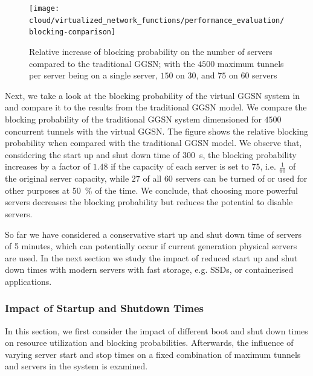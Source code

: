 \begin{figure}
  \centering
  \texttt{[image: cloud/virtualized\_network\_functions/performance\_evaluation/blocking-comparison]}
  \caption{Relative increase of blocking probability on the number of servers compared to the traditional \gls{GGSN}; with the \(4500\) maximum tunnels per server being on a single server, \(150\) on \(30\), and \(75\) on \(60\) servers}
  \label{fig:cloud:virtualized_network_functions:performance_evaluation:virtual_ggsn:blocking_comparison}
\end{figure}

Next, we take a look at the blocking probability of the virtual \gls{GGSN} system in  and compare it to the results from the traditional \gls{GGSN} model.
We compare the blocking probability of the traditional \gls{GGSN} system dimensioned for \(4500\) concurrent tunnels with the virtual \gls{GGSN}.
The figure shows the relative blocking probability when compared with the traditional \gls{GGSN} model.
We observe that, considering the start up and shut down time of \SI{300}{\second}, the blocking probability increases by a factor of \(1.48\) if the capacity of each server is set to \(75\), i.e. \(\frac{1}{60}\) of the original server capacity, while \(27\) of all \(60\) servers can be turned of or used for other purposes at \SI{50}{\percent} of the time.
We conclude, that choosing more powerful servers decreases the blocking probability but reduces the potential to disable servers.

So far we have considered a conservative start up and shut down time of servers of 5 minutes, which can potentially occur if current generation physical servers are used.
In the next section we study the impact of reduced start up and shut down times with modern servers with fast storage, e.g. \glspl{SSD}, or containerised applications.

\subsubsection*{Impact of Startup and Shutdown Times}\label{sec:cloud_virtualized_network_functions:startup_shutdown}

In this section, we first consider the impact of different boot and shut down times on resource utilization and blocking probabilities.
Afterwards, the influence of varying server start and stop times on a fixed combination of maximum tunnels and servers in the system is examined.

